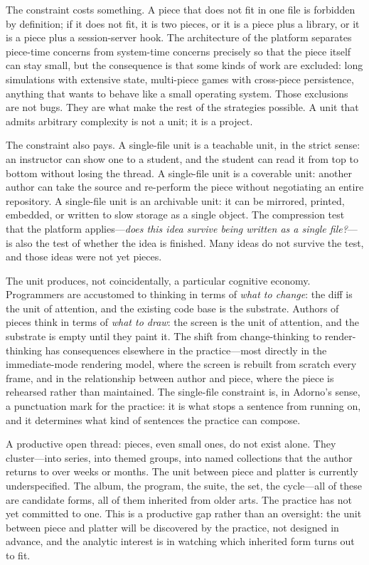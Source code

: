 \documentclass[10pt,letterpaper,twocolumn]{article}
\begin{document}
The constraint costs something. A piece that does not fit in one file is forbidden by definition; if it does not fit, it is two pieces, or it is a piece plus a library, or it is a piece plus a session-server hook. The architecture of the platform separates piece-time concerns from system-time concerns precisely so that the piece itself can stay small, but the consequence is that some kinds of work are excluded: long simulations with extensive state, multi-piece games with cross-piece persistence, anything that wants to behave like a small operating system. Those exclusions are not bugs. They are what make the rest of the strategies possible. A unit that admits arbitrary complexity is not a unit; it is a project.

The constraint also pays. A single-file unit is a teachable unit, in the strict sense: an instructor can show one to a student, and the student can read it from top to bottom without losing the thread. A single-file unit is a coverable unit: another author can take the source and re-perform the piece without negotiating an entire repository. A single-file unit is an archivable unit: it can be mirrored, printed, embedded, or written to slow storage as a single object. The compression test that the platform applies---\emph{does this idea survive being written as a single file?}---is also the test of whether the idea is finished. Many ideas do not survive the test, and those ideas were not yet pieces.

The unit produces, not coincidentally, a particular cognitive economy. Programmers are accustomed to thinking in terms of \emph{what to change}: the diff is the unit of attention, and the existing code base is the substrate. Authors of pieces think in terms of \emph{what to draw}: the screen is the unit of attention, and the substrate is empty until they paint it. The shift from change-thinking to render-thinking has consequences elsewhere in the practice---most directly in the immediate-mode rendering model, where the screen is rebuilt from scratch every frame, and in the relationship between author and piece, where the piece is rehearsed rather than maintained. The single-file constraint is, in Adorno's sense, a punctuation mark for the practice: it is what stops a sentence from running on, and it determines what kind of sentences the practice can compose.

A productive open thread: pieces, even small ones, do not exist alone. They cluster---into series, into themed groups, into named collections that the author returns to over weeks or months. The unit between piece and platter is currently underspecified. The album, the program, the suite, the set, the cycle---all of these are candidate forms, all of them inherited from older arts. The practice has not yet committed to one. This is a productive gap rather than an oversight: the unit between piece and platter will be discovered by the practice, not designed in advance, and the analytic interest is in watching which inherited form turns out to fit.
\end{document}

